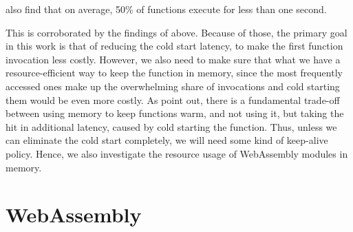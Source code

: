 \citeauthor{Shahrad2020} also find that on average, 50\% of functions execute for less than one second.

\begin{quote}
\end{quote}

This is corroborated by the findings of \citeauthor{Wang2018} above.
Because of those, the primary goal in this work is that of reducing the cold start latency, to make the first function invocation less costly. However, we also need to make sure that what we have a resource-efficient way to keep the function in memory, since the most frequently accessed ones make up the overwhelming share of invocations and cold starting them would be even more costly.
As \citeauthor{Shahrad2020} point out, there is a fundamental trade-off between using memory to keep functions warm, and not using it, but taking the hit in additional latency, caused by cold starting the function. Thus, unless we can eliminate the cold start completely, we will need some kind of keep-alive policy. Hence, we also investigate the resource usage of WebAssembly modules in memory.


\section{WebAssembly}


